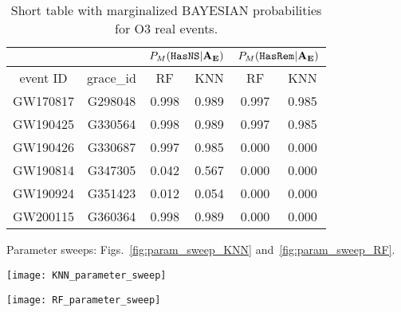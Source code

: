 \begin{table}[]
\begin{tabular}{c|c|cc|cc}
\hline
\multicolumn{1}{c|}{}         & \multicolumn{1}{l|}{} & \multicolumn{2}{c|}{$P_M({{\tt HasNS}}|{\bf A}_{\bf E})$}                                                & \multicolumn{2}{c}{$P_M({{\tt HasRem}}|{\bf A}_{\bf E})$}                                                \\ \hline
\multicolumn{1}{c|}{event ID} & grace\_id             & \multicolumn{1}{c}{RF} & \multicolumn{1}{c}{KNN}  & \multicolumn{1}{c}{RF} & \multicolumn{1}{c}{KNN} \\ \hline
GW170817                      & G298048               & 0.998                   & 0.989                    & 0.997                   & 0.985                                  \\
GW190425                      & G330564               & 0.998                   & 0.989                    & 0.997                   & 0.985                            \\
GW190426                      & G330687               & 0.997                   & 0.985                    & 0.000                   & 0.000                     \\
GW190814                      & G347305               & 0.042                   & 0.567                   & 0.000                  & 0.000                      \\
GW190924                      & G351423               & 0.012                   & 0.054                   & 0.000               & 0.000                       \\               
GW200115                      & G360364               & 0.998                   & 0.989                   & 0.000                  & 0.000                           \\
\hline
\end{tabular}
\caption{Short table with marginalized BAYESIAN probabilities for O3 real events.}
\label{tab:real_data_bayesian}
\end{table}




Parameter sweeps:  Figs.~\ref{fig:param_sweep_KNN} and~\ref{fig:param_sweep_RF}.

\begin{figure*}%
\texttt{[image: KNN\_parameter\_sweep]}
    \caption{}
\label{fig:param_sweep_KNN}
\end{figure*}

\begin{figure*}%
\texttt{[image: RF\_parameter\_sweep]}
    \caption{}
\label{fig:param_sweep_RF}
\end{figure*}



